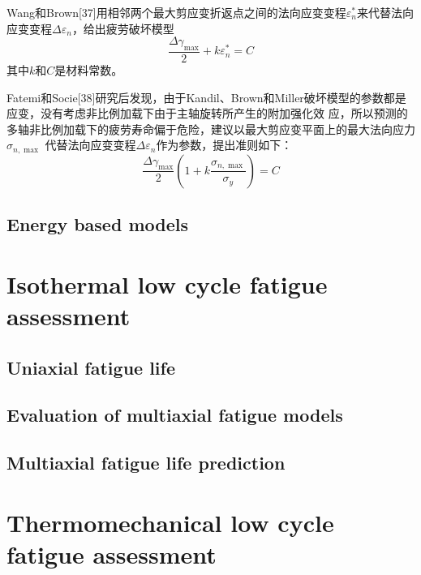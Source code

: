 Wang和Brown[37]用相邻两个最大剪应变折返点之间的法向应变变程${\varepsilon _n^*}$来代替法向应变变程$\Delta {\varepsilon _n}$，给出疲劳破坏模型
\[\frac{{\Delta {\gamma _{\max }}}}{2} + k\varepsilon _n^* = C\]
其中$k$和$C$是材料常数。

Fatemi和Socie[38]研究后发现，由于Kandil、Brown和Miller破坏模型的参数都是应变，没有考虑非比例加载下由于主轴旋转所产生的附加强化效
应，所以预测的多轴非比例加载下的疲劳寿命偏于危险，建议以最大剪应变平面上的最大法向应力${\sigma _{n,\max }}$
代替法向应变变程$\Delta {\varepsilon _n}$作为参数，提出准则如下：
\[\frac{{\Delta {\gamma _{\max }}}}{2}\left( {1 + k\frac{{{\sigma _{n,\max }}}}{{{\sigma _y}}}} \right) = C\]

\subsection{Energy based models}

\section{Isothermal low cycle fatigue assessment}

\subsection{Uniaxial fatigue life}
\subsection{Evaluation of multiaxial fatigue models}
\subsection{Multiaxial fatigue life prediction}

\section{Thermomechanical low cycle fatigue assessment}

